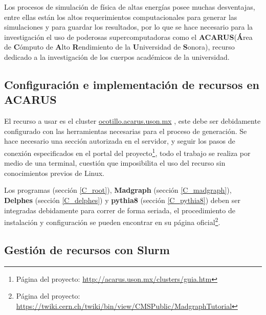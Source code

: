 Los procesos de simulación de física de altas energías posee muchas desventajas, entre ellas están los altos requerimientos computacionales para generar las simulaciones y para guardar los resultados, por lo que se hace necesario para la investigación el uso de poderosas supercomputadoras como el \textbf{ACARUS}(\textbf{Á}rea de \textbf{C}ómputo de \textbf{A}lto \textbf{R}endimiento de la \textbf{U}niversidad de \textbf{S}onora), recurso dedicado a la investigación de los cuerpos académicos de la universidad.

\subsection{Configuración e implementación de recursos en ACARUS}
El recurso a usar es el cluster \href{ocotillo.acarus.uson.mx}{ocotillo.acarus.uson.mx} %
, este debe ser debidamente configurado con las herramientas necesarias para el proceso de generación. Se hace necesario una sección autorizada en el servidor, y seguir los pasos de conexión especificados en el portal del proyecto\footnote{ Página del proyecto: \href{http://acarus.uson.mx/clusters/guia.htm}{http://acarus.uson.mx/clusters/guia.htm}}, todo el trabajo se realiza por medio de una terminal, cuestión que imposibilita el uso del recurso sin conocimientos previos de Linux.

Los programas \ROOT (sec\-ción \ref{C_root}), \textbf{Madgraph} (sec\-ción \ref{C_madgraph}), \textbf{Del\-phes} (sec\-ción \-\ref{C_delphes}) y \textbf{py\-thia8} (sec\-ción \ref{C_pythia8}) de\-ben ser integradas debidamente para correr de forma seriada, el procedimiento de instalación y configuración se pueden encontrar en su página oficial\footnote{Página del proyecto: \href{https://twiki.cern.ch/twiki/bin/view/CMSPublic/MadgraphTutorial}{https://twiki.cern.ch/twiki/bin/view/CMSPublic/MadgraphTutorial}}. 

\subsection{Gestión de recursos con Slurm}

